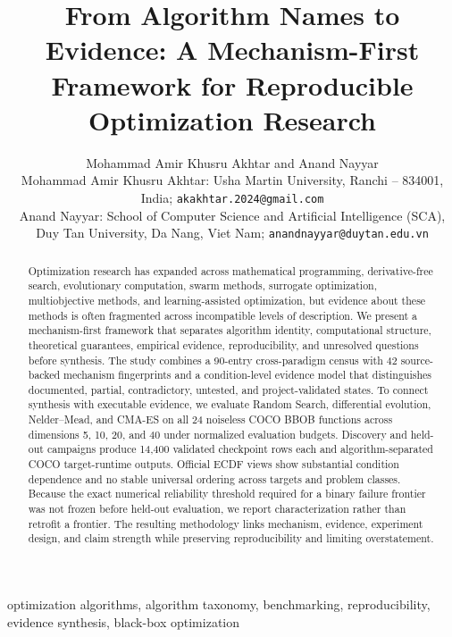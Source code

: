 \documentclass[journal]{IEEEtran}
\title{From Algorithm Names to Evidence: A Mechanism-First Framework for Reproducible Optimization Research}
\author{Mohammad Amir Khusru Akhtar and Anand Nayyar\\
\small Mohammad Amir Khusru Akhtar: Usha Martin University, Ranchi -- 834001, India; \texttt{akakhtar.2024@gmail.com}\\
\small Anand Nayyar: School of Computer Science and Artificial Intelligence (SCA), Duy Tan University, Da Nang, Viet Nam; \texttt{anandnayyar@duytan.edu.vn}}
\begin{document}
\maketitle
\begin{abstract}
Optimization research has expanded across mathematical programming, derivative-free search, evolutionary computation, swarm methods, surrogate optimization, multiobjective methods, and learning-assisted optimization, but evidence about these methods is often fragmented across incompatible levels of description. We present a mechanism-first framework that separates algorithm identity, computational structure, theoretical guarantees, empirical evidence, reproducibility, and unresolved questions before synthesis. The study combines a 90-entry cross-paradigm census with 42 source-backed mechanism fingerprints and a condition-level evidence model that distinguishes documented, partial, contradictory, untested, and project-validated states. To connect synthesis with executable evidence, we evaluate Random Search, differential evolution, Nelder--Mead, and CMA-ES on all 24 noiseless COCO BBOB functions across dimensions 5, 10, 20, and 40 under normalized evaluation budgets. Discovery and held-out campaigns produce 14,400 validated checkpoint rows each and algorithm-separated COCO target-runtime outputs. Official ECDF views show substantial condition dependence and no stable universal ordering across targets and problem classes. Because the exact numerical reliability threshold required for a binary failure frontier was not frozen before held-out evaluation, we report characterization rather than retrofit a frontier. The resulting methodology links mechanism, evidence, experiment design, and claim strength while preserving reproducibility and limiting overstatement.
\end{abstract}

\begin{IEEEkeywords}
optimization algorithms, algorithm taxonomy, benchmarking, reproducibility, evidence synthesis, black-box optimization
\end{IEEEkeywords}













\end{document}
